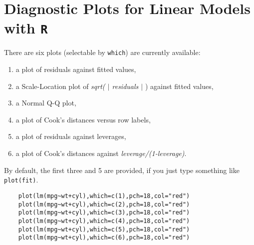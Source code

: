\documentclass[residuals.tex]{subfiles}
\begin{document}
\Large
\newpage
\section{Diagnostic Plots for Linear Models with \texttt{R}}

There are six plots (selectable by \texttt{which}) are currently available: 
\begin{enumerate}
	\item a plot of residuals against fitted values, 
	\item a Scale-Location plot of \textit{sqrt( $|$ residuals $|$ }) against fitted values, 
	\item a Normal Q-Q plot, 
	\item a plot of Cook's distances versus row labels, 
	\item a plot of residuals against leverages, 
	\item a plot of Cook's distances against \textit{leverage/(1-leverage)}.
\end{enumerate} 

\noindent By default, the first three and 5 are provided, if you just type something like \texttt{plot(fit)}.
\newpage
\begin{framed}
	\begin{verbatim}
	plot(lm(mpg~wt+cyl),which=c(1),pch=18,col="red")
	plot(lm(mpg~wt+cyl),which=c(2),pch=18,col="red")
	plot(lm(mpg~wt+cyl),which=c(3),pch=18,col="red")
	plot(lm(mpg~wt+cyl),which=c(4),pch=18,col="red")
	plot(lm(mpg~wt+cyl),which=c(5),pch=18,col="red")
	plot(lm(mpg~wt+cyl),which=c(6),pch=18,col="red")
	\end{verbatim}
\end{framed}
\end{document}
